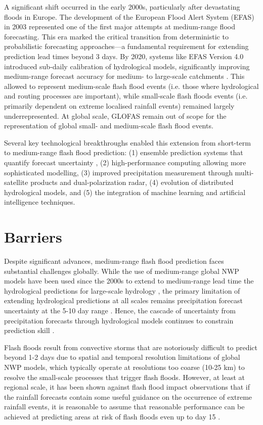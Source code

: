 A significant shift occurred in the early 2000s, particularly after devastating floods in Europe. The development of the European Flood Alert System (EFAS) in 2003 represented one of the first major attempts at medium-range flood forecasting. This era marked the critical transition from deterministic to probabilistic forecasting approaches—a fundamental requirement for extending prediction lead times beyond 3 days. By 2020, systems like EFAS Version 4.0 introduced sub-daily calibration of hydrological models, significantly improving medium-range forecast accuracy for medium- to large-scale catchments \citep{Mazzetti_2021}. This allowed to represent medium-scale flash flood events (i.e. those where hydrological and routing processes are important), while small-scale flash floods events (i.e. primarily dependent on extreme localised rainfall events) remained largely underrepresented. At global scale, GLOFAS remain out of scope for the representation of global small- and medium-scale flash flood events. 

Several key technological breakthroughs enabled this extension from short-term to medium-range flash flood prediction: (1) ensemble prediction systems that quantify forecast uncertainty \citep{Martinaitis_2023, Flamig_2020}, (2) high-performance computing allowing more sophisticated modelling, (3) improved precipitation measurement through multi-satellite products and dual-polarization radar, (4) evolution of distributed hydrological models, and (5) the integration of machine learning and artificial intelligence techniques.


\section{Barriers}

Despite significant advances, medium-range flash flood prediction faces substantial challenges globally. While the use of medium-range global NWP models have been used since the 2000s to extend to medium-range lead time the hydrological predictions for large-scale hydrology \citep{Gouweleeuw_2005}, the primary limitation of extending hydrological predictions at all scales remains precipitation forecast uncertainty at the 5-10 day range \citep{Jasper_2002}. Hence, the cascade of uncertainty from precipitation forecasts through hydrological models continues to constrain prediction skill \citep{Georgakakos_2022a}. 

Flash floods result from convective storms that are notoriously difficult to predict beyond 1-2 days due to spatial and temporal resolution limitations of global NWP models, which typically operate at resolutions too coarse (10-25 km) to resolve the small-scale processes that trigger flash floods. However, at least at regional scale, it has been shown against flash flood impact observations that if the rainfall forecasts contain some useful guidance on the occurrence of extreme rainfall events, it is reasonable to assume that reasonable performance can be achieved at predicting areas at risk of flash floods even up to day 15 \citep{Tripathy_2020}.

